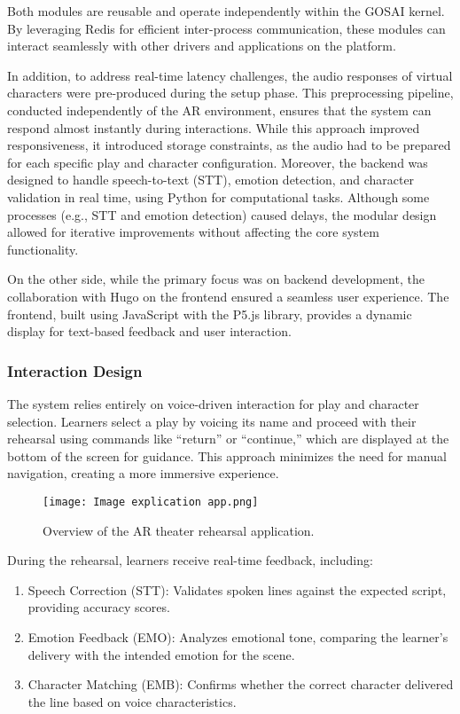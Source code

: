 Both modules are reusable and operate independently within the GOSAI kernel. By leveraging Redis for efficient inter-process communication, these modules can interact seamlessly with other drivers and applications on the platform.

In addition, to address real-time latency challenges, the audio responses of virtual characters were pre-produced during the setup phase. This preprocessing pipeline, conducted independently of the AR environment, ensures that the system can respond almost instantly during interactions. While this approach improved responsiveness, it introduced storage constraints, as the audio had to be prepared for each specific play and character configuration. Moreover, the backend was designed to handle speech-to-text (STT), emotion detection, and character validation in real time, using Python for computational tasks. Although some processes (e.g., STT and emotion detection) caused delays, the modular design allowed for iterative improvements without affecting the core system functionality.

On the other side, while the primary focus was on backend development, the collaboration with Hugo on the frontend ensured a seamless user experience. The frontend, built using JavaScript with the P5.js library, provides a dynamic display for text-based feedback and user interaction.

\subsubsection{Interaction Design}

The system relies entirely on voice-driven interaction for play and character selection. Learners select a play by voicing its name and proceed with their rehearsal using commands like “return” or “continue,” which are displayed at the bottom of the screen for guidance. This approach minimizes the need for manual navigation, creating a more immersive experience.

\begin{figure}[h!]
    \centering
    \texttt{[image: Image explication app.png]}
    \caption{Overview of the AR theater rehearsal application.}
    \vspace{0.1cm}
    \label{fig:app_explication}
\end{figure}

During the rehearsal, learners receive real-time feedback, including:
\begin{enumerate}
\item Speech Correction (STT): Validates spoken lines against the expected script, providing accuracy scores.
\item Emotion Feedback (EMO): Analyzes emotional tone, comparing the learner’s delivery with the intended emotion for the scene.
\item Character Matching (EMB): Confirms whether the correct character delivered the line based on voice characteristics.
\end{enumerate}

